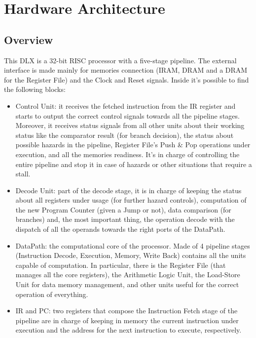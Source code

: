 \chapter{Hardware Architecture}

\section{Overview}

This DLX is a 32-bit RISC processor with a five-stage pipeline. The external interface is made mainly for memories connection (IRAM, DRAM and a DRAM for the Register File) and the Clock and Reset signals. Inside it's possible to find the following blocks:

\begin{itemize}
    \item Control Unit: it receives the fetched instruction from the IR register and starts to output the correct control signals towards all the pipeline stages. Moreover, it receives status signals from all other units about their working status like the comparator result (for branch decision), the status about possible hazards in the pipeline, Register File's Push \& Pop operations under execution, and all the memories readiness. It's in charge of controlling the entire pipeline and stop it in case of hazards or other situations that require a stall.
    \item Decode Unit: part of the decode stage, it is in charge of keeping the status about all registers under usage (for further hazard controls), computation of the new Program Counter (given a Jump or not), data comparison (for branches) and, the most important thing, the operation decode with the dispatch of all the operands towards the right ports of the DataPath.
    \item DataPath: the computational core of the processor. Made of 4 pipeline stages (Instruction Decode, Execution, Memory, Write Back) contains all the units capable of computation. In particular, there is the Register File (that manages all the core registers), the Arithmetic Logic Unit, the Load-Store Unit for data memory management, and other units useful for the correct operation of everything.
    \item IR and PC: two registers that compose the Instruction Fetch stage of the pipeline are in charge of keeping in memory the current instruction under execution and the address for the next instruction to execute, respectively. 
\end{itemize}


